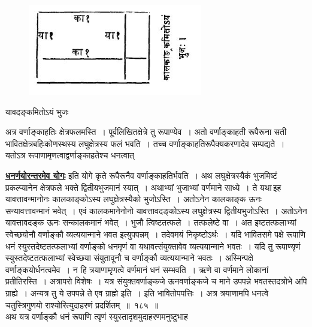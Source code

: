 \documentclass[11pt, openany]{book}
\begin{document}
\begin{figure}[h!]
    \centering
    \includegraphics[scale=0.7]{graphics/Capture26.png}
\end{figure}
\vspace{-10mm}

\begin{center}
यावदङ्कमितोऽयं भुजः ~~~~
\end{center}

 अत्र वर्णाङ्काहतिः क्षेत्रफलमस्ति~। पूर्वलिखितक्षेत्रे तु रूपाण्येव~। अतो
वर्णाङ्काहती रूपैरूना सती भावितक्षेत्रबहिःकोणस्थस्य लघुक्षेत्रस्य फलं
भवति~। तच्च वर्णाङ्काहतिरूपैक्यकरणादेव सम्पद्यते~। यतोऽत्र
रूपाणामृणत्वाद्वर्णाङ्काहतेश्च धनत्वात् 

\newpage
\noindent \hyperref[3]{\textbf{धनर्णयोरन्तरमेव योगः}} इति योगे कृते रूपैरूनैव वर्णाङ्काहतिर्भवति~। अथ
लघुक्षेत्रस्यैकं भुजमिष्टं प्रकल्प्यानेन क्षेत्रफले भक्ते द्वितीयभुजमानं स्यात्~।
अथाभ्यां भुजाभ्यां वर्णमाने साध्ये~। ते यथा\textendash \,इह यावत्तावन्मानोनः कालकाङ्कोऽस्य लघुक्षेत्रस्यैको भुजोऽस्ति~। अतोऽनेन कालकाङ्क ऊनः
सन्यावत्तावन्मानं
भवेत्~। एवं कालकमानेनोनो यावत्तावदङ्कोऽस्य लघुक्षेत्रस्य
द्वितीयभुजोऽस्ति~।
अतोऽनेन यावत्तावदङ्क ऊनः सन्कालकमानं भवेत्~। भुजौ त्विष्टतत्फले~।
तत्फलेष्टे
वा~। अत इष्टतत्फलाभ्यां स्वेच्छयोनौ वर्णाङ्कौ व्यत्ययान्माने भवत
इत्युपपन्नम्~।
तदेवमयं निकृष्टोऽर्थः~। यदि भावितसमे पक्षे रूपाणि धनं
स्युस्तदेष्टतत्फलाभ्यां
वर्णाङ्को धनमृणं वा यथावत्संयुक्तावेव व्यत्ययान्माने भवतः~। यदि तु
रूपाण्यृणं
स्युस्तदेष्टतत्फलाभ्यां स्वेच्छया संयुतावूनौ च वर्णाङ्कौ व्यत्ययान्माने
भवतः~।
अस्मिन्पक्षे वर्णाङ्कयोर्धनत्वमेव~। न हि त्रयाणामृणत्वे वर्णमानं धनं
सम्भवति~।
ऋणे वा वर्णमाने लोकानां प्रतीतिरस्ति~। अत्रापरो विशेषः~। यत्र संयुक्तवर्णाङ्कजे ऊनवर्णाङ्कजे च माने उपपन्ने भवतस्तदत्रोभे अपि ग्राह्ये~।
अन्यत्र तु ये
उपपन्ने ते एव ग्राह्मे इति~। इति भावितोपपत्तिः~। अत्र त्रयाणामपि धनत्वे
चतुस्त्रिगुणयो राश्योरित्युदाहरणं प्रदर्शितम्~॥~१८५~॥~\\

\vspace{-2mm}
 अथ यत्र वर्णाङ्कौ धनं रूपाणि त्वृणं स्युस्तादृशमुदाहरणमनुष्टुभाह\textendash
\end{document}
